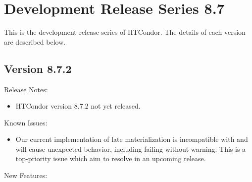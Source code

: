 
\section{\label{sec:History-8-7}Development Release Series 8.7}

This is the development release series of HTCondor.
The details of each version are described below.

\subsection*{\label{sec:New-8-7-2}Version 8.7.2}

\noindent Release Notes:

\begin{itemize}

\item HTCondor version 8.7.2 not yet released.

\end{itemize}

\noindent Known Issues:

\begin{itemize}

\item Our current implementation of late materialization is incompatible with
 and will cause unexpected behavior, including failing without
warning. This is a top-priority issue which aim to resolve in an upcoming
release.

\end{itemize}

\noindent New Features:


